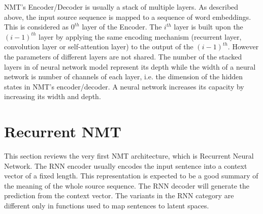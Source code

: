 NMT's Encoder/Decoder is usually a stack of multiple layers. As described above, the input source sequence is mapped to a sequence of word embeddings. This is considered as $0^{th}$ layer of the Encoder. The $i^{th}$ layer is built upon the $(i-1)^{th}$ layer by applying the same encoding mechanism (recurrent layer, convolution layer or self-attention layer) to the output of the $(i-1)^{th}$. However the parameters of different layers are not shared. The number of the stacked layers in of neural network model represent its depth while the width of a neural network is number of channels of each layer, i.e. the dimension of the hidden states in NMT's encoder/decoder. A neural network increases its capacity by increasing its width and depth.

\section{Recurrent NMT} \label{sec:rrn}
This section reviews the very first NMT architecture, which is Recurrent Neural Network. The RNN encoder usually encodes the input sentence into a context vector of a fixed length. This representation is expected to be a good summary of the meaning of the whole source sequence. The RNN decoder will generate the prediction from the context vector. The variants in the RNN category are different only in functions used to map sentences to latent spaces.

